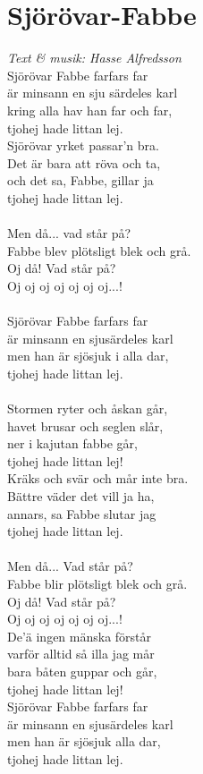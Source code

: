 \section{Sjörövar-Fabbe}
\textit{Text \& musik: Hasse Alfredsson}
\vspace{2mm}\\
Sjörövar Fabbe farfars far\\
är minsann en sju särdeles karl\\
kring alla hav han far och far,\\
tjohej hade littan lej.\\
Sjörövar yrket passar'n bra.\\
Det är bara att röva och ta,\\
och det sa, Fabbe, gillar ja\\
tjohej hade littan lej.\\
\\
Men då... vad står på?\\
Fabbe blev plötsligt blek och grå.\\
Oj då! Vad står på?\\
Oj oj oj oj oj oj oj...!\\
\\
Sjörövar Fabbe farfars far\\
är minsann en sjusärdeles karl\\
men han är sjösjuk i alla dar,\\
tjohej hade littan lej.\\
\\
Stormen ryter och åskan går,\\
havet brusar och seglen slår,\\
ner i kajutan fabbe går,\\
tjohej hade littan lej!\\
Kräks och svär och mår inte bra.\\
Bättre väder det vill ja ha,\\
annars, sa Fabbe slutar jag\\
tjohej hade littan lej.\\
\\
Men då... Vad står på?\\
Fabbe blir plötsligt blek och grå.\\
Oj då! Vad står på?\\
Oj oj oj oj oj oj oj...!\\
De'ä ingen mänska förstår\\
varför alltid så illa jag mår\\
bara båten guppar och går,\\
tjohej hade littan lej!\\
Sjörövar Fabbe farfars far\\
är minsann en sjusärdeles karl\\
men han är sjösjuk alla dar,\\
tjohej hade littan lej.

